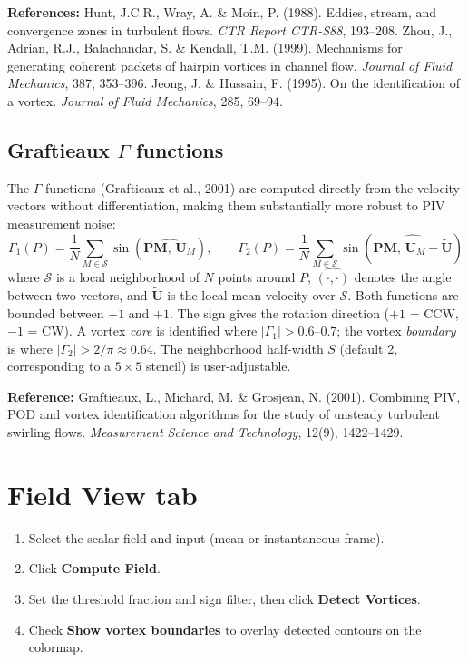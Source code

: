 \documentclass[11pt, a4paper]{report}
\newcommand{\uipth}[1]{\textbf{\textcolor{upblue}{#1}}}
\begin{document}
\noindent\textbf{References:} Hunt, J.C.R., Wray, A. \& Moin, P. (1988). Eddies, stream, and convergence zones in turbulent flows. \textit{CTR Report CTR-S88}, 193--208. Zhou, J., Adrian, R.J., Balachandar, S. \& Kendall, T.M. (1999). Mechanisms for generating coherent packets of hairpin vortices in channel flow. \textit{Journal of Fluid Mechanics}, 387, 353--396. Jeong, J. \& Hussain, F. (1995). On the identification of a vortex. \textit{Journal of Fluid Mechanics}, 285, 69--94.

\subsection*{Graftieaux $\Gamma$ functions}

The $\Gamma$ functions (Graftieaux et al., 2001) are computed directly from the velocity vectors without differentiation, making them substantially more robust to PIV measurement noise:
\[
\Gamma_1(P) = \frac{1}{N} \sum_{M \in \mathcal{S}} \sin\!\left(\widehat{\mathbf{PM},\, \mathbf{U}_M}\right), \qquad
\Gamma_2(P) = \frac{1}{N} \sum_{M \in \mathcal{S}} \sin\!\left(\widehat{\mathbf{PM},\, \mathbf{U}_M - \widetilde{\mathbf{U}}}\right)
\]
where $\mathcal{S}$ is a local neighborhood of $N$ points around $P$, $\widehat{(\cdot,\cdot)}$ denotes the angle between two vectors, and $\widetilde{\mathbf{U}}$ is the local mean velocity over $\mathcal{S}$. Both functions are bounded between $-1$ and $+1$. The sign gives the rotation direction ($+1$ = CCW, $-1$ = CW). A vortex \emph{core} is identified where $|\Gamma_1| > 0.6$--$0.7$; the vortex \emph{boundary} is where $|\Gamma_2| > 2/\pi \approx 0.64$. The neighborhood half-width $S$ (default 2, corresponding to a $5 \times 5$ stencil) is user-adjustable.

\noindent\textbf{Reference:} Graftieaux, L., Michard, M. \& Grosjean, N. (2001). Combining PIV, POD and vortex identification algorithms for the study of unsteady turbulent swirling flows. \textit{Measurement Science and Technology}, 12(9), 1422--1429.

\section{Field View tab}

\begin{stepbox}
\begin{enumerate}[leftmargin=1.5em, topsep=2pt]
  \item Select the scalar field and input (mean or instantaneous frame).
  \item Click \uipth{Compute Field}.
  \item Set the threshold fraction and sign filter, then click \uipth{Detect Vortices}.
  \item Check \uipth{Show vortex boundaries} to overlay detected contours on the colormap.
\end{enumerate}
\end{stepbox}
\end{document}
